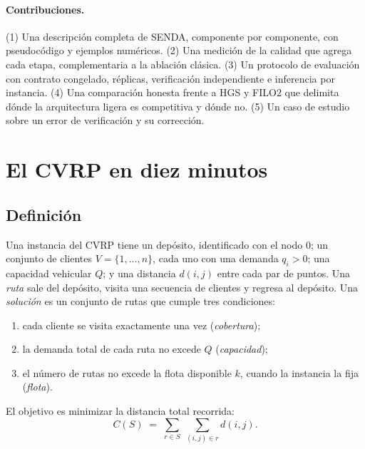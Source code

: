 \documentclass[11pt,a4paper]{article}
\newcommand{\senda}{SENDA}
\begin{document}
\paragraph{Contribuciones.}
(1) Una descripción completa de \senda{}, componente por componente, con pseudocódigo y ejemplos
numéricos.
(2) Una medición de la calidad que agrega cada etapa, complementaria a la ablación clásica.
(3) Un protocolo de evaluación con contrato congelado, réplicas, verificación independiente e
inferencia por instancia.
(4) Una comparación honesta frente a HGS y FILO2 que delimita dónde la arquitectura ligera es
competitiva y dónde no.
(5) Un caso de estudio sobre un error de verificación y su corrección.

\section{El CVRP en diez minutos}
\label{sec:cvrp}

\subsection{Definición}
Una instancia del CVRP tiene un depósito, identificado con el nodo $0$; un conjunto de clientes
$V=\{1,\dots,n\}$, cada uno con una demanda $q_i>0$; una capacidad vehicular $Q$; y una distancia
$d(i,j)$ entre cada par de puntos. Una \emph{ruta} sale del depósito, visita una secuencia de
clientes y regresa al depósito. Una \emph{solución} es un conjunto de rutas que cumple tres
condiciones:
\begin{enumerate}[label=(\roman*)]
\item cada cliente se visita exactamente una vez (\emph{cobertura});
\item la demanda total de cada ruta no excede $Q$ (\emph{capacidad});
\item el número de rutas no excede la flota disponible $k$, cuando la instancia la fija
(\emph{flota}).
\end{enumerate}
El objetivo es minimizar la distancia total recorrida:
\begin{equation}
C(S) \;=\; \sum_{r\in S}\;\sum_{(i,j)\in r} d(i,j).
\label{eq:costo}
\end{equation}
\end{document}
